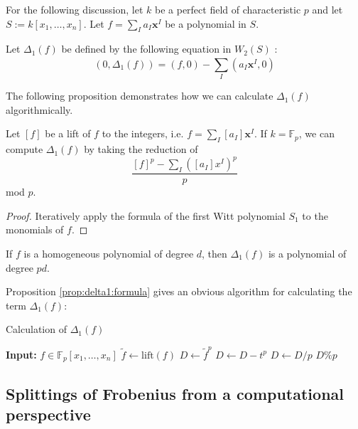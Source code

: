 For the following discussion, 
let \(k\) be a perfect field of characteristic \(p\) and 
let \(S := k[x_{1}, \ldots, x_{n}]\).
Let \(f = \sum_{I}^{} a_{I}\mathbf{x}^{I}\) be a polynomial in \(S\).

\begin{defn}
	Let \(\Delta_{1}(f)\)
	be defined by the following equation in \(W_{2}(S)\) :
	\[
		(0, \Delta_{1}(f)) = (f,0) - \sum_{I}^{} (a_{I}\mathbf{x}^{I}, 0) 
	\] 
\end{defn}

The following proposition demonstrates how we can calculate 
\(\Delta_{1}(f)\) algorithmically.

\begin{prop}
	\label{prop:delta1:formula}
	Let \([f]\) be a lift of \(f\) to the integers,
	i.e.
	\(f = \sum_{I}^{} [a_{I}] \mathbf{x}^{I}\).
	If \(k = \mathbb{F}_{p}\),
	we can compute \(\Delta_{1}(f)\) by 
	taking the reduction of
	\[
		\frac{[f]^{p} - \sum_{I}^{} ([a_{I}]x^{I})^{p} }{p}
	\] 
	mod \(p\).
\end{prop}

\begin{proof}
	Iteratively apply the formula of the first
	Witt polynomial \(S_{1}\) 
	to the monomials of \(f\).
\end{proof}

\begin{rmk}
	If \(f\) is a homogeneous polynomial of degree \(d\), 
	then \(\Delta_{1}(f)\) is a polynomial of degree \(pd\).
\end{rmk}

Proposition \ref{prop:delta1:formula} gives an obvious algorithm
for calculating the term \(\Delta_{1}(f)\): 

\begin{algorithm}[H]
\caption{Calculation of \(\Delta_{1}(f)\) }
	\label{alg:calc:delta1}
    \begin{algorithmic}[1]
		\State \textbf{Input:} \(f \in \mathbb{F}_{p}[x_{1}, \ldots, x_{n}]\) 
		\State \(\tilde{f} \gets \text{lift}(f)\) 
		\State \(D \gets \tilde{f}^{p}\) 
		    \State \(D \gets D - t^{p}\) 
		\EndFor
		\State \(D \gets D / p\)
		\State \Return \(D \% p\) 
	\end{algorithmic}
\end{algorithm}

\subsection{Splittings of Frobenius from a computational perspective}

